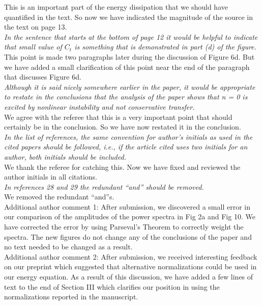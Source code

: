 \documentclass[12pt]{article}
\begin{document}
{\noindent This is an important part of the energy dissipation that we should have quantified in the text. So now we have indicated the magnitude of the source in the text on page 13. }\\

{\noindent \itshape   In the sentence that starts at the bottom of page 12 it would be helpful to indicate that
small value of $C_t$ is something that is demonstrated in part (d) of the figure. }\\

{\noindent This point is made two paragraphs later during the discussion of Figure 6d. But we have added a small clarification of this point near the end of the paragraph that discusses Figure 6d. }\\

{\noindent \itshape   Although it is said nicely somewhere earlier in the paper, it would be appropriate to
restate in the conclusions that the analysis of the paper shows that n = 0 is excited by
nonlinear instability and not conservative transfer. }\\

{\noindent We agree with the referee that this is a very important point that should certainly be in the conclusion. So we have now restated it in the conclusion. }\\

{\noindent \itshape  In the list of references, the same convention for author’s initials as used in the cited
papers should be followed, i.e., if the article cited uses two initials for an author, both
initials should be included. }\\

{\noindent We thank the referee for catching this. Now we have fixed and reviewed the author initials in all citations. }\\

{\noindent \itshape In references 28 and 29 the redundant “and” should be removed. }\\

{\noindent We removed the redundant ``and''s. }\\


Additional author comment 1: After submission, we discovered a small error in our comparison of the amplitudes of the power spectra in Fig 2a and Fig 10. 
We have corrected the error by using Parseval's Theorem to correctly weight the spectra. The new figures do not change any of the conclusions of the paper and no text needed to be changed as a result. \\

Additional author comment 2: After submission, we received interesting feedback on our preprint which suggested that alternative normalizations could be used in our energy equation. As a result of this discussion, we have added a few lines of text to the end of Section III which clarifies our position in using the normalizations reported in the manuscript. \\
\end{document}
